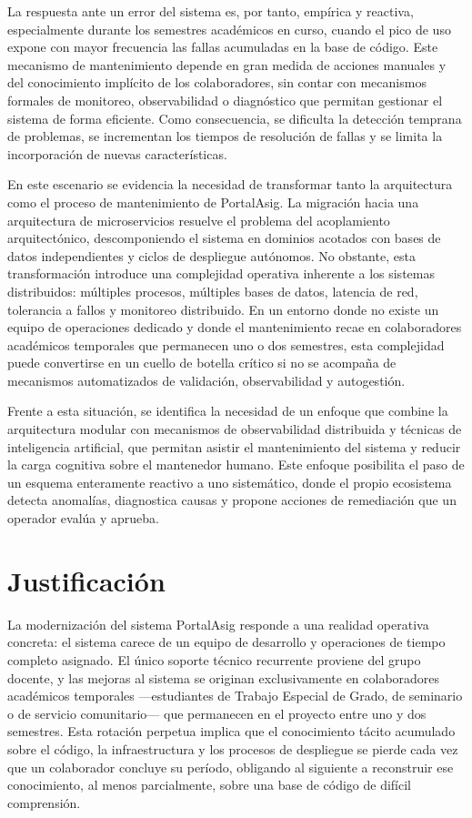 La respuesta ante un error del sistema es, por tanto, emp\'{i}rica y reactiva,
especialmente durante los semestres acad\'{e}micos en curso, cuando el pico de uso
expone con mayor frecuencia las fallas acumuladas en la base de c\'{o}digo. Este mecanismo de mantenimiento depende en gran medida
de acciones manuales y del conocimiento impl\'{i}cito de los colaboradores, sin contar
con mecanismos formales de monitoreo, observabilidad o diagn\'{o}stico que permitan
gestionar el sistema de forma eficiente. Como consecuencia, se dificulta la
detecci\'{o}n temprana de problemas, se incrementan los tiempos de resoluci\'{o}n de
fallas y se limita la incorporaci\'{o}n de nuevas caracter\'{i}sticas.

En este escenario se evidencia la necesidad de transformar tanto la arquitectura
como el proceso de mantenimiento de PortalAsig. La migraci\'{o}n hacia una
arquitectura de microservicios resuelve el problema del acoplamiento
arquitect\'{o}nico, descomponiendo el sistema en dominios acotados con bases de datos
independientes y ciclos de despliegue aut\'{o}nomos. No obstante, esta
transformaci\'{o}n introduce una complejidad operativa inherente a los sistemas
distribuidos: m\'{u}ltiples procesos, m\'{u}ltiples bases de datos, latencia de red,
tolerancia a fallos y monitoreo distribuido. En un entorno donde no existe un
equipo de operaciones dedicado y donde el mantenimiento recae en colaboradores
acad\'{e}micos temporales que permanecen uno o dos semestres, esta complejidad puede
convertirse en un cuello de botella cr\'{i}tico si no se acompa\~{n}a de mecanismos
automatizados de validaci\'{o}n, observabilidad y autogesti\'{o}n.

Frente a esta situaci\'{o}n, se identifica la necesidad de un enfoque que combine la
arquitectura modular con mecanismos de observabilidad distribuida y t\'{e}cnicas de
inteligencia artificial, que permitan asistir el mantenimiento del sistema y
reducir la carga cognitiva sobre el mantenedor humano. Este enfoque posibilita el
paso de un esquema enteramente reactivo a uno sistem\'{a}tico, donde el propio
ecosistema detecta anomal\'{i}as, diagnostica causas y propone acciones de
remediaci\'{o}n que un operador eval\'{u}a y aprueba.

\section{Justificaci\'{o}n}

La modernizaci\'{o}n del sistema PortalAsig responde a una realidad operativa
concreta: el sistema carece de un equipo de desarrollo y operaciones de tiempo
completo asignado. El \'{u}nico soporte t\'{e}cnico recurrente proviene del grupo docente,
y las mejoras al sistema se originan
exclusivamente en colaboradores acad\'{e}micos temporales ---estudiantes de Trabajo
Especial de Grado, de seminario o de servicio comunitario--- que permanecen en el
proyecto entre uno y dos semestres. Esta rotaci\'{o}n perpetua implica que el
conocimiento t\'{a}cito acumulado sobre el c\'{o}digo, la infraestructura y los procesos de
despliegue se pierde cada vez que un colaborador concluye su per\'{i}odo, obligando al
siguiente a reconstruir ese conocimiento, al menos parcialmente, sobre una base de c\'{o}digo de
dif\'{i}cil comprensi\'{o}n.

